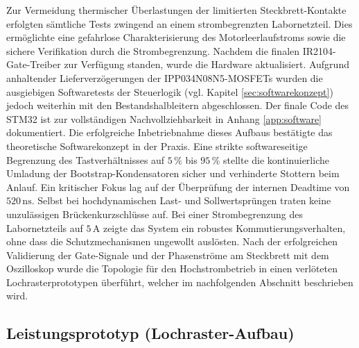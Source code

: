Zur Vermeidung thermischer Überlastungen der limitierten Steckbrett-Kontakte erfolgten sämtliche Tests zwingend an einem strombegrenzten Labornetzteil. Dies ermöglichte eine gefahrlose Charakterisierung des Motorleerlaufstroms sowie die sichere Verifikation durch die Strombegrenzung. Nachdem die finalen IR2104-Gate-Treiber zur Verfügung standen, wurde die Hardware aktualisiert. Aufgrund anhaltender Lieferverzögerungen der IPP034N08N5-MOSFETs wurden die ausgiebigen Softwaretests der Steuerlogik (vgl. Kapitel \ref{sec:softwarekonzept}) jedoch weiterhin mit den Bestandshalbleitern abgeschlossen. Der finale Code des STM32 ist zur vollständigen Nachvollziehbarkeit in Anhang \ref{app:software} dokumentiert.
Die erfolgreiche Inbetriebnahme dieses Aufbaus bestätigte das theoretische Softwarekonzept in der Praxis. Eine strikte softwareseitige Begrenzung des Tastverhältnisses auf $5\,\%$ bis $95\,\%$ stellte die kontinuierliche Umladung der Bootstrap-Kondensatoren sicher und verhinderte Stottern beim Anlauf. Ein kritischer Fokus lag auf der Überprüfung der internen Deadtime von $520\,\mathrm{ns}$. Selbst bei hochdynamischen Last- und Sollwertsprüngen traten keine unzulässigen Brückenkurzschlüsse auf. 
Bei einer Strombegrenzung des Labornetzteils auf $5\,\mathrm{A}$ zeigte das System ein robustes Kommutierungsverhalten, ohne dass die Schutzmechanismen ungewollt auslösten. Nach der erfolgreichen Validierung der Gate-Signale und der Phasenströme am Steckbrett mit dem Oszilloskop wurde die Topologie für den Hochstrombetrieb in einen verlöteten Lochrasterprototypen überführt, welcher im nachfolgenden Abschnitt beschrieben wird.

\subsection{Leistungsprototyp (Lochraster-Aufbau)}

